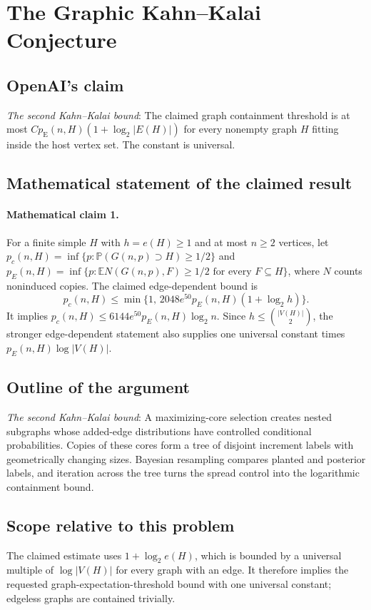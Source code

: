 \documentclass[11pt]{article}
\begin{document}
\section*{The Graphic Kahn–Kalai Conjecture}

\subsection{OpenAI's claim}
\textit{The second Kahn--Kalai bound}: The claimed graph containment threshold is at most $C p_{\mathrm E}(n,H)(1+\log_2 |E(H)|)$ for every nonempty graph $H$ fitting inside the host vertex set. The constant is universal.

\subsection{Mathematical statement of the claimed result}
\paragraph{Mathematical claim 1.} For a finite simple $H$ with $h=e(H)\ge1$ and at most $n\ge2$ vertices, let $p_c(n,H)=\inf\{p:\mathbb P(G(n,p)\supset H)\ge1/2\}$ and $p_E(n,H)=\inf\{p:\mathbb E N(G(n,p),F)\ge1/2\text{ for every }F\subseteq H\}$, where $N$ counts noninduced copies. The claimed edge-dependent bound is \[p_c(n,H)\le\min\{1,\,2048e^{50}p_E(n,H)(1+\log_2h)\}.\] It implies $p_c(n,H)\le6144e^{50}p_E(n,H)\log_2n$. Since $h\le\binom{|V(H)|}{2}$, the stronger edge-dependent statement also supplies one universal constant times $p_E(n,H)\log|V(H)|$.

\subsection{Outline of the argument}
\textit{The second Kahn--Kalai bound}: A maximizing-core selection creates nested subgraphs whose added-edge distributions have controlled conditional probabilities. Copies of these cores form a tree of disjoint increment labels with geometrically changing sizes. Bayesian resampling compares planted and posterior labels, and iteration across the tree turns the spread control into the logarithmic containment bound.

\subsection{Scope relative to this problem}
The claimed estimate uses $1+\log_2 e(H)$, which is bounded by a universal multiple of $\log|V(H)|$ for every graph with an edge. It therefore implies the requested graph-expectation-threshold bound with one universal constant; edgeless graphs are contained trivially.
\end{document}
